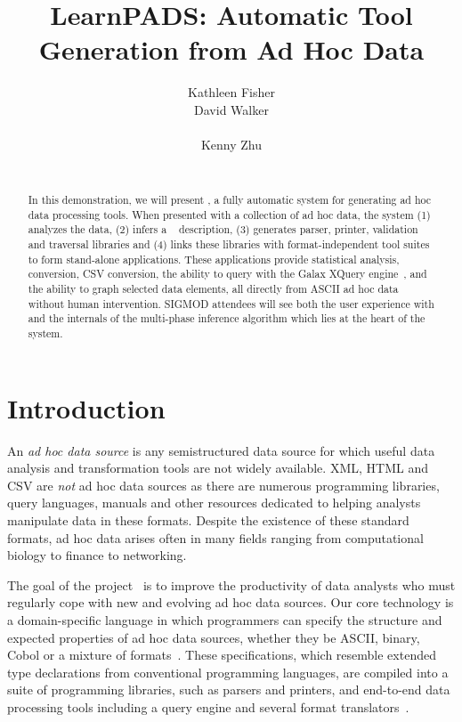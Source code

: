 \documentclass[preprint]{sig-alternate-sigmod08}
\title{LearnPADS: Automatic Tool Generation from Ad Hoc Data}
\author{\alignauthor Kathleen Fisher \\
\affaddr{AT\&T Labs Research}
\email{kfisher@research.att.com}
\alignauthor David Walker \\
\affaddr{Princeton University}\\
\email{dpw@cs.princeton.edu}
\alignauthor Kenny Zhu \\
\affaddr{Princeton University}\\
\email{kzhu@cs.princeton.edu}
}
\begin{document}
\maketitle
\begin{abstract}
In this demonstration, we will present \learnpads, 
a fully automatic system for generating
ad hoc data processing tools.  When presented with a collection of
ad hoc data, the system (1) analyzes the data, (2) infers a 
\pads{}~\cite{fisher+:pads,fisher+:popl06} description, (3) 
generates parser, printer, validation and traversal libraries and (4)
links these libraries with format-independent  
tool suites to form stand-alone applications.  These applications provide
statistical analysis, \xml{}
conversion, CSV conversion, the ability to query with the 
Galax XQuery engine~\cite{fernandez+:padx}, and the ability to 
graph selected data elements, all
directly from ASCII ad hoc data without human intervention.
SIGMOD attendees will see both the user experience with \learnpads{} and
the internals of the multi-phase inference algorithm which lies at
the heart of the system. 
\end{abstract}

\section{Introduction}
An {\em ad hoc data source} is any semistructured data source
for which useful data analysis and transformation tools
are not widely available. XML, HTML and CSV are {\em not} 
ad hoc data sources as there are numerous programming libraries,
query languages, manuals and other resources dedicated to
helping analysts manipulate data in these formats.
Despite the existence of these standard formats, ad hoc data arises
often in many fields ranging from computational biology to finance to networking.

The goal of the \pads{} project~\cite{padsweb} is to improve the
productivity of data analysts who must regularly cope with new and evolving
ad hoc data sources.  Our core technology is a
domain-specific language in which programmers can specify the
structure and expected properties of ad hoc data sources, whether they
be ASCII, binary, Cobol or a mixture of formats~\cite{fisher+:pads,fisher+:popl06}.  These
specifications, which resemble extended type declarations from
conventional programming languages, are compiled into a suite of
programming libraries, such as parsers and printers, and 
end-to-end data processing tools including a query engine 
and several format translators~\cite{fernandez+:padl,fernandez+:padx,mandelbaum+:pads-ml}.
\end{document}
